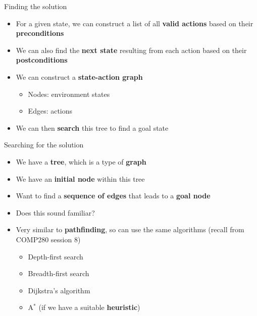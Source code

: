 \begin{frame}{Finding the solution}
	\begin{itemize}
		\pause\item For a given state, we can construct a list of all \textbf{valid actions}
			based on their \textbf{preconditions}
		\pause\item We can also find the \textbf{next state} resulting from each action
			based on their \textbf{postconditions}
		\pause\item We can construct a \textbf{state-action graph}
		\begin{itemize}
			\pause\item Nodes: environment states
			\pause\item Edges: actions
		\end{itemize}
		\pause\item We can then \textbf{search} this tree to find a goal state
	\end{itemize}
\end{frame}

\begin{frame}{Searching for the solution}
	\begin{itemize}
		\pause\item We have a \textbf{tree}, which is a type of \textbf{graph}
		\pause\item We have an \textbf{initial node} within this tree
		\pause\item Want to find a \textbf{sequence of edges} that leads to a \textbf{goal node}
		\pause\item Does this sound familiar?
		\pause\item Very similar to \textbf{pathfinding}, so can use the same algorithms (recall from COMP280 session 8)
		\begin{itemize}
			\pause\item Depth-first search
			\pause\item Breadth-first search
			\pause\item Dijkstra's algorithm
			\pause\item A$^*$ (if we have a suitable \textbf{heuristic})
		\end{itemize}
	\end{itemize}
\end{frame}
